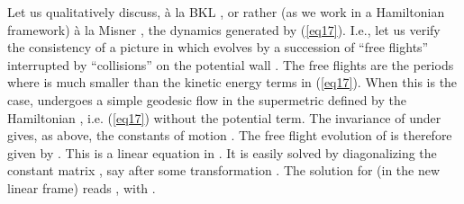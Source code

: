 \documentclass[a4paper,12pt]{article}
\begin{document}
Let us qualitatively discuss, \`a la BKL \cite{BKL}, 
or rather (as we work in
a Hamiltonian framework) \`a la Misner \cite{misner69},
the dynamics generated by 
(\ref{eq17}). I.e., let us verify the consistency of a picture 
in which \coordHE{} evolves by a succession of ``free flights'' 
interrupted by ``collisions'' on the potential wall \coordHE{}. The free flights are the periods where \coordHE{} is 
much smaller than the kinetic energy terms \coordHE{} 
in (\ref{eq17}). When this is the case, \coordHE{} undergoes a simple geodesic flow in the supermetric
defined by the Hamiltonian \coordHE{}, i.e. (\ref{eq17}) without the
potential term. The invariance of \coordHE{} under \coordHE{} 
gives, as above, the constants of motion \coordHE{}. The free flight evolution of \coordHE{} is 
therefore given by 
\coordHE{}. This is a linear 
equation in \coordHE{}. It is easily solved by diagonalizing the constant 
matrix \coordHE{}, say \coordHE{}  after some \coordHE{} transformation \coordHE{}. The solution for 
\coordHE{} (in the new linear frame) reads
\coordHE{}, 
with \coordHE{}. 
\end{document}
